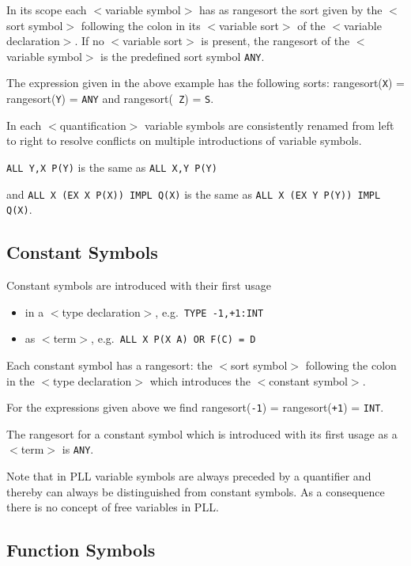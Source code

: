 In its scope each $<$variable symbol$>$ has as rangesort the sort
given by the $<$sort symbol$>$ following the colon in its $<$variable
sort$>$ of the $<$variable declaration$>$. If no $<$variable sort$>$
is present, the rangesort of the $<$variable symbol$>$ is the
predefined sort symbol {\tt ANY}.

\Ex

The expression given in the above example has the following sorts:
rangesort({\tt X}) = rangesort({\tt Y}) = {\tt ANY} and rangesort({\tt
Z}) = {\tt S}.

In each $<$quantification$>$ variable symbols are consistently renamed from 
left to right to resolve conflicts on multiple introductions of variable 
symbols.  

\Ex

{\tt ALL Y,X P(Y)} is the same as {\tt ALL X,Y P(Y)} 

and {\tt ALL X (EX X P(X)) IMPL Q(X)} is the same as {\tt ALL X (EX Y
P(Y)) IMPL Q(X)}.

\subsection{Constant Symbols}
\label{ConstantSymbols} 

Constant symbols are introduced with their first usage 
\begin{itemize}
\item in a $<$type declaration$>$, e.g.\ {\tt TYPE -1,+1:INT}
\item as $<$term$>$, e.g.\ {\tt ALL X P(X A) OR F(C) = D}
\end{itemize}

Each constant symbol has a rangesort: the $<$sort symbol$>$ following the 
colon in the $<$type declaration$>$ which introduces the $<$constant symbol$>$. 

\Ex

For the expressions given above we find
rangesort({\tt -1}) = rangesort({\tt +1}) = {\tt INT}.

The rangesort for a constant symbol which is introduced with its first 
usage as a $<$term$>$ is {\tt ANY}.

Note that in PLL variable symbols are always preceded by a quantifier and 
thereby can always be distinguished from constant symbols. As a 
consequence there is no concept of free variables in PLL. 

\subsection{Function Symbols}
\label{Function Symbols} 

